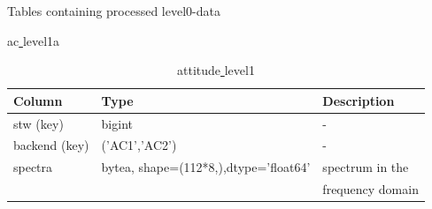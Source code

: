 \documentclass[12pt]{article}
\begin{document}
\begin{table}
  \begin{tiny}
     \captionsetup{font=scriptsize}
    \caption{Tables containing processed level0-data}
    \label{table:level1data}
    \begin{subtable}{.9\linewidth}
      \captionsetup{font=scriptsize}
      \centering
      \label{table:ac1a}
\caption{ac\underline{ }level1a}

        \begin{tabular}{l l l}
\hline\hline
Column & Type & Description \\ [0.5ex]
\hline
stw (key)    & bigint         & - \\
backend (key) & ('AC1','AC2')  & -\\
spectra & bytea, shape=(112*8,),dtype='float64' & spectrum in the \\
& & frequency domain\\[1ex]
\hline
\end{tabular}

       
    \end{subtable}%
   \newline
   \newline

\begin{subtable}{.9\linewidth}
      \captionsetup{font=scriptsize}
      \centering
      \label{table:att1}
\caption{attitude\underline{ }level1}


\end{subtable}
\end{tiny}
\end{table}
\end{document}
